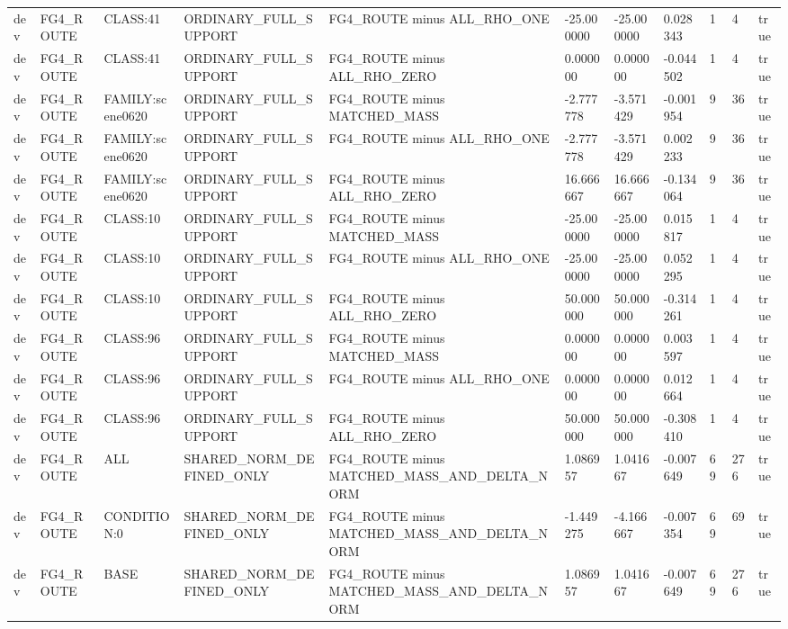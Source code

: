 \begin{tabular}{lllllllllll}
dev & FG4\_ROUTE & CLASS:41 & ORDINARY\_FULL\_SUPPORT & FG4\_ROUTE minus ALL\_RHO\_ONE & -25.000000 & -25.000000 & 0.028343 & 1 & 4 & true \\
dev & FG4\_ROUTE & CLASS:41 & ORDINARY\_FULL\_SUPPORT & FG4\_ROUTE minus ALL\_RHO\_ZERO & 0.000000 & 0.000000 & -0.044502 & 1 & 4 & true \\
dev & FG4\_ROUTE & FAMILY:scene0620 & ORDINARY\_FULL\_SUPPORT & FG4\_ROUTE minus MATCHED\_MASS & -2.777778 & -3.571429 & -0.001954 & 9 & 36 & true \\
dev & FG4\_ROUTE & FAMILY:scene0620 & ORDINARY\_FULL\_SUPPORT & FG4\_ROUTE minus ALL\_RHO\_ONE & -2.777778 & -3.571429 & 0.002233 & 9 & 36 & true \\
dev & FG4\_ROUTE & FAMILY:scene0620 & ORDINARY\_FULL\_SUPPORT & FG4\_ROUTE minus ALL\_RHO\_ZERO & 16.666667 & 16.666667 & -0.134064 & 9 & 36 & true \\
dev & FG4\_ROUTE & CLASS:10 & ORDINARY\_FULL\_SUPPORT & FG4\_ROUTE minus MATCHED\_MASS & -25.000000 & -25.000000 & 0.015817 & 1 & 4 & true \\
dev & FG4\_ROUTE & CLASS:10 & ORDINARY\_FULL\_SUPPORT & FG4\_ROUTE minus ALL\_RHO\_ONE & -25.000000 & -25.000000 & 0.052295 & 1 & 4 & true \\
dev & FG4\_ROUTE & CLASS:10 & ORDINARY\_FULL\_SUPPORT & FG4\_ROUTE minus ALL\_RHO\_ZERO & 50.000000 & 50.000000 & -0.314261 & 1 & 4 & true \\
dev & FG4\_ROUTE & CLASS:96 & ORDINARY\_FULL\_SUPPORT & FG4\_ROUTE minus MATCHED\_MASS & 0.000000 & 0.000000 & 0.003597 & 1 & 4 & true \\
dev & FG4\_ROUTE & CLASS:96 & ORDINARY\_FULL\_SUPPORT & FG4\_ROUTE minus ALL\_RHO\_ONE & 0.000000 & 0.000000 & 0.012664 & 1 & 4 & true \\
dev & FG4\_ROUTE & CLASS:96 & ORDINARY\_FULL\_SUPPORT & FG4\_ROUTE minus ALL\_RHO\_ZERO & 50.000000 & 50.000000 & -0.308410 & 1 & 4 & true \\
dev & FG4\_ROUTE & ALL & SHARED\_NORM\_DEFINED\_ONLY & FG4\_ROUTE minus MATCHED\_MASS\_AND\_DELTA\_NORM & 1.086957 & 1.041667 & -0.007649 & 69 & 276 & true \\
dev & FG4\_ROUTE & CONDITION:0 & SHARED\_NORM\_DEFINED\_ONLY & FG4\_ROUTE minus MATCHED\_MASS\_AND\_DELTA\_NORM & -1.449275 & -4.166667 & -0.007354 & 69 & 69 & true \\
dev & FG4\_ROUTE & BASE & SHARED\_NORM\_DEFINED\_ONLY & FG4\_ROUTE minus MATCHED\_MASS\_AND\_DELTA\_NORM & 1.086957 & 1.041667 & -0.007649 & 69 & 276 & true \\

\end{tabular}

